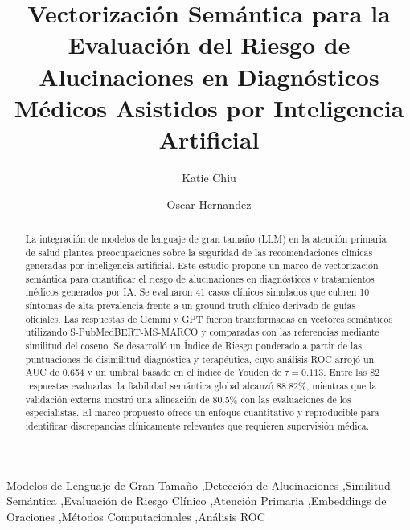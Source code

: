 \documentclass[final,11pt,3p]{elsarticle}
\begin{document}
\begin{frontmatter}


\title{Vectorización Semántica para la Evaluación del Riesgo de Alucinaciones en Diagnósticos Médicos Asistidos por Inteligencia Artificial}


\author[label1]{Katie Chiu}

\author[label2,label3]{Oscar Hernandez}

\address[label1]{Universidad Nacional Autónoma de Honduras, Comayagua, Honduras}


\begin{abstract}
La integración de modelos de lenguaje de gran tamaño (LLM) en la atención primaria de salud plantea preocupaciones sobre la seguridad de las recomendaciones clínicas generadas por inteligencia artificial. Este estudio propone un marco de vectorización semántica para cuantificar el riesgo de alucinaciones en diagnósticos y tratamientos médicos generados por IA. Se evaluaron 41 casos clínicos simulados que cubren 10 síntomas de alta prevalencia frente a un ground truth clínico derivado de guías oficiales. Las respuestas de Gemini y GPT fueron transformadas en vectores semánticos utilizando S-PubMedBERT-MS-MARCO y comparadas con las referencias mediante similitud del coseno. Se desarrolló un Índice de Riesgo ponderado a partir de las puntuaciones de disimilitud diagnóstica y terapéutica, cuyo análisis ROC arrojó un AUC de 0.654 y un umbral basado en el índice de Youden de $\tau=0.113$. Entre las 82 respuestas evaluadas, la fiabilidad semántica global alcanzó 88.82\%, mientras que la validación externa mostró una alineación de 80.5\% con las evaluaciones de los especialistas. El marco propuesto ofrece un enfoque cuantitativo y reproducible para identificar discrepancias clínicamente relevantes que requieren supervisión médica.
\end{abstract}



\begin{keyword}

Modelos de Lenguaje de Gran Tamaño
\sep Detección de Alucinaciones
\sep Similitud Semántica
\sep Evaluación de Riesgo Clínico
\sep Atención Primaria
\sep Embeddings de Oraciones
\sep Métodos Computacionales
\sep Análisis ROC

\end{keyword}

\end{frontmatter}
\end{document}
